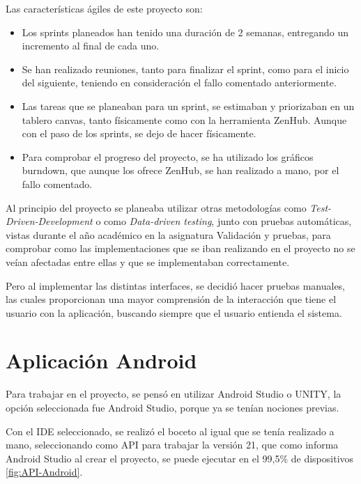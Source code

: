 Las características ágiles de este proyecto son:
\begin{itemize}
    \item Los sprints planeados han tenido una duración de 2 semanas, entregando un incremento al final de cada uno.
    \item Se han realizado reuniones, tanto para finalizar el sprint, como para el inicio del siguiente, teniendo en consideración el fallo comentado anteriormente.
    \item Las tareas que se planeaban para un sprint, se estimaban y priorizaban en un tablero canvas, tanto físicamente como con la herramienta ZenHub. Aunque con el paso de los sprints, se dejo de hacer físicamente.
    \item Para comprobar el progreso del proyecto, se ha utilizado los gráficos burndown, que aunque los ofrece ZenHub, se han realizado a mano, por el fallo comentado.
\end{itemize}

Al principio del proyecto se planeaba utilizar otras metodologías como \textit{Test-Driven-Development} o como \textit{Data-driven testing}, junto con pruebas automáticas, vistas durante el año académico en la asignatura Validación y pruebas, para comprobar como las implementaciones que se iban realizando en el proyecto no se veían afectadas entre ellas y que se implementaban correctamente. 

Pero al implementar las distintas interfaces, se decidió hacer pruebas manuales, las cuales proporcionan una mayor comprensión de la interacción que tiene el usuario con la aplicación, buscando siempre que el usuario entienda el sistema.

\section{Aplicación Android}

Para trabajar en el proyecto, se pensó en utilizar Android Studio o UNITY, la opción seleccionada fue Android Studio, porque ya se tenían nociones previas. 

Con el IDE seleccionado, se realizó el boceto al igual que se tenía realizado a mano, seleccionando como API para trabajar la versión 21, que como informa Android Studio al crear el proyecto, se puede ejecutar en el 99,5\% de dispositivos \ref{fig:API-Android}.

